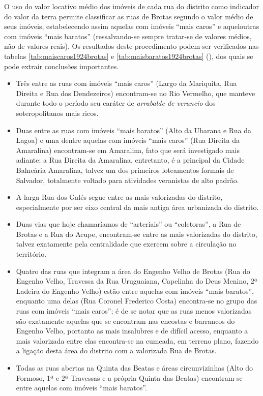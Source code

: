 

O uso do valor locativo médio dos imóveis de cada rua do distrito como indicador do valor da terra permite classificar as ruas de Brotas segundo o valor médio de seus imóveis, estabelecendo assim aquelas com imóveis ``mais caros'' e aqueloutras com imóveis ``mais baratos'' (ressalvando-se sempre tratar-se de valores médios, não de valores reais). Os resultados deste procedimento podem ser verificados nas tabelas \autoref{tab:maiscaros1924brotas} e \autoref{tab:maisbaratos1924brotas} (\pageref{tab:maisbaratos1924brotas}), dos quais se pode extrair conclusões importantes.




\begin{itemize}
\item Três entre as ruas com imóveis ``mais caros'' (Largo da Mariquita, Rua Direita e Rua dos Dendezeiros) encontram-se no Rio Vermelho, que manteve durante todo o período seu caráter de \textit{arrabalde de veraneio} dos soteropolitanos mais ricos. 
\item Duas entre as ruas com imóveis ``mais baratos'' (Alto da Ubarana e Rua da Lagoa) e uma dentre aquelas com imóveis ``mais caros'' (Rua Direita da Amaralina) encontram-se em Amaralina, fato que será investigado mais adiante; a Rua Direita da Amaralina, entretanto, é a principal da Cidade Balneária Amaralina, talvez um dos primeiros loteamentos formais de Salvador, totalmente voltado para atividades veranistas de alto padrão.
\item A larga Rua dos Galés segue entre as mais valorizadas do distrito, especialmente por ser eixo central da mais antiga área urbanizada do distrito.
\item Duas vias que hoje chamaríamos de ``arteriais'' ou ``coletoras'', a Rua de Brotas e a Rua do Acupe, encontram-se entre as mais valorizadas do distrito, talvez exatamente pela centralidade que exercem sobre a circulação no território.
\item Quatro das ruas que integram a área do Engenho Velho de Brotas (Rua do Engenho Velho, Travessa da Rua Uruguaiana, Capelinha do Deus Menino, 2ª Ladeira do Engenho Velho) estão entre aquelas com imóveis ``mais baratos'', enquanto uma delas (Rua Coronel Frederico Costa) encontra-se no grupo das ruas com imóveis ``mais caros''; é de se notar que as ruas menos valorizadas são exatamente aquelas que se encontram nas encostas e barrancos do Engenho Velho, portanto as mais insalubres e de difícil acesso, enquanto a mais valorizada entre elas encontra-se na cumeada, em terreno plano, fazendo a ligação desta área do distrito com a valorizada Rua de Brotas.
\item Todas as ruas abertas na Quinta das Beatas e áreas circunvizinhas (Alto do Formoso, 1ª e 2ª Travessas e a própria Quinta das Beatas) encontram-se entre aquelas com imóveis ``mais baratos''.
\end{itemize}


